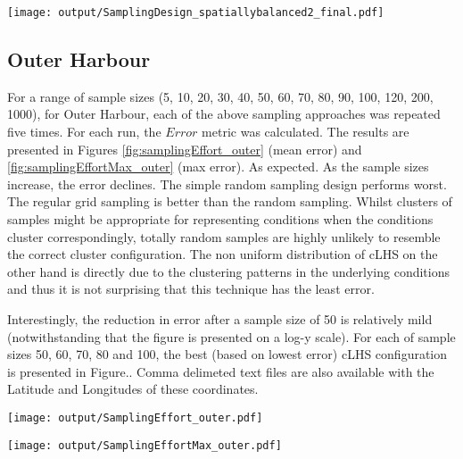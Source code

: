 \documentclass[a4paper]{article}
\let\origfigure=\figure
\let\endorigfigure=\endfigure
\renewenvironment{figure}[1][]{%
   \origfigure[H]
}{%
   \endorigfigure
}
\begin{document}
\begin{figure}
\centering\scriptsize
\texttt{[image: output/SamplingDesign\_spatiallybalanced2\_final.pdf]}
\caption{Two dimensional spatially balanced sampling configuration for
the East Arm (100
samples)\label{fig:SamplingDesign_spatiallybalanced2_final}}
\end{figure}

\hypertarget{outer-harbour}{%
\subsection{Outer Harbour}\label{outer-harbour}}

For a range of sample sizes (5, 10, 20, 30, 40, 50, 60, 70, 80, 90, 100,
120, 200, 1000), for Outer Harbour, each of the above sampling
approaches was repeated five times. For each run, the \(Error\) metric
was calculated. The results are presented in Figures
\ref{fig:samplingEffort_outer} (mean error) and
\ref{fig:samplingEffortMax_outer} (max error). As expected. As the
sample sizes increase, the error declines. The simple random sampling
design performs worst. The regular grid sampling is better than the
random sampling. Whilst clusters of samples might be appropriate for
representing conditions when the conditions cluster correspondingly,
totally random samples are highly unlikely to resemble the correct
cluster configuration. The non uniform distribution of cLHS on the other
hand is directly due to the clustering patterns in the underlying
conditions and thus it is not surprising that this technique has the
least error.

Interestingly, the reduction in error after a sample size of 50 is
relatively mild (notwithstanding that the figure is presented on a log-y
scale). For each of sample sizes 50, 60, 70, 80 and 100, the best (based
on lowest error) cLHS configuration is presented in Figure.. Comma
delimeted text files are also available with the Latitude and Longitudes
of these coordinates.

\begin{figure}
\centering\scriptsize
\texttt{[image: output/SamplingEffort\_outer.pdf]}
\caption{Comparison of the mean Error conditional on sample size and
sampling method for the Outer Harbour\label{fig:samplingEffort_outer}}
\end{figure}

\begin{figure}
\centering\scriptsize
\texttt{[image: output/SamplingEffortMax\_outer.pdf]}
\caption{Comparison of the maximum Error conditional on sample size and
sampling method for the Outer
Harbour\label{fig:samplingEffortMax_outer}}
\end{figure}
\end{document}
